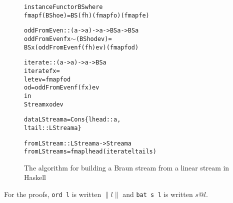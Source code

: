 \documentclass{llncs}
\newcommand{\ord}[1]{\|#1\|}
\begin{document}
\begin{figure}
\begin{alltt}
instance Functor BS where
    fmap f (BS h o e) = BS (f h) (fmap f o) (fmap f e)

oddFromEven :: (a -> a) -> a -> BS a -> BS a
oddFromEven f x  \(\sim\)(BS h od ev) =
    BS x (oddFromEven f (f h) ev) (fmap f od)

iterate :: (a -> a) -> a -> BS a
iterate f x =
    let ev = fmap f od
        od = oddFromEven f (f x) ev
    in
      Stream x od ev

data LStream a = Cons \{lhead::a,
                       ltail::LStream a\}

fromLStream :: LStream a -> Stream a
fromLStream s = fmap lhead (iterate ltail s)
\end{alltt}
\caption{The algorithm for building a Braun stream from a linear stream in Haskell}
\label{iterateCode}
\end{figure}

For the proofs, \verb|ord l| is written $\ord{l}$ and \verb|bat s l| is written $s@l$.
\end{document}
